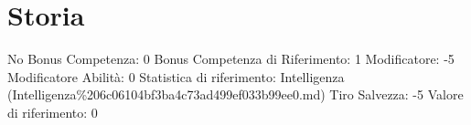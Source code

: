 \section{Storia}\label{storia}

\begin{description}
\tightlist
\item[Tags: ABI]
No Bonus Competenza: 0 Bonus Competenza di Riferimento: 1 Modificatore:
-5 Modificatore Abilità: 0 Statistica di riferimento: Intelligenza
(Intelligenza\%206c06104bf3ba4c73ad499ef033b99ee0.md) Tiro Salvezza: -5
Valore di riferimento: 0
\end{description}
